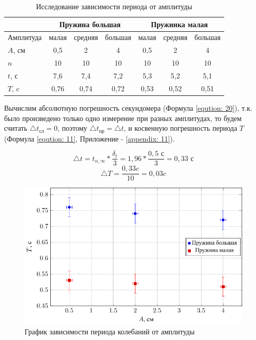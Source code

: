 \begin{table}[htbp]
	\label{tabular:measuring_2}
	\caption{Исследование зависимости периода от амплитуды}
	\centering
	\begin{tabular}{|l|c|c|c|c|c|c|}
		\hline
		          & \multicolumn{3}{c|}{Пружина большая} & \multicolumn{3}{c|}{Пружинка малая} \\ \hline
		Амплитуда & малая & средняя &      большая       & малая & средняя &      большая      \\ \hline
		$A$, см   &  0,5  &    2    &         4          &  0,5  &    2    &         4         \\ \hline
		$n$       &  10   &   10    &         10         &  10   &   10    &        10         \\ \hline
		$t$, с    &  7,6  &   7,4   &        7,2         &  5,3  &   5,2   &        5,1        \\ \hline
		$T$, c    & 0,76  &  0,74   &        0,72        & 0,53  &  0,52   &       0,51        \\ \hline
	\end{tabular}
\end{table}

Вычислим абсолютную погрешность секундомера (Формула \ref{eqution: 20}), т.к. было произведено только одно измерение при разных амплитудах, то будем считать $\triangle t_\text{сл} = 0$, поэтому $\triangle t_\text{пр} = \triangle t$,  и косвенную погрешность периода $T$ (Формула \ref{eqution: 11}, Приложение - \ref{appendix: 11}).

\begin{equation}
	\label{eqution: 21}
	\triangle t = t_{\alpha, \infty} * \frac{\delta _t}{3} = 1,96 * \frac{0,5 \text{ с}}{3} = 0,33 \text{ с}
\end{equation}
\begin{equation}
	\label{eqution: 22}
	\triangle T = \frac{0,33 c}{10} = 0,03 c
\end{equation}

\begin{figure}[htbp]
	\centering
	\includegraphics[scale=1]{img/graph_1}
	\caption{График зависимости периода колебаний от амплитуды}
	\label{fig:ris2}
\end{figure}
\newpage
